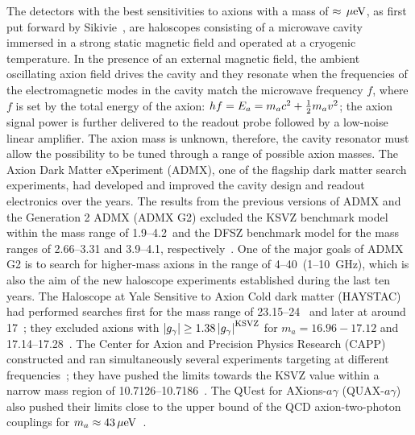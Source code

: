 The detectors with the best sensitivities to axions with a mass of 
$\approx \,\mu\text{e\hspace{-.08em}V}$, as first put forward by 
Sikivie~\cite{SikivieI,SikivieII},  
are haloscopes consisting of a microwave cavity immersed in a strong static 
magnetic field and operated at a cryogenic temperature. 
In the presence of an external magnetic field, the ambient oscillating axion 
field drives the cavity and they resonate when the frequencies of the 
electromagnetic 
modes in the cavity match the microwave frequency $f$, where $f$ is set by 
the total energy of the axion: $hf=E_a=m_a c^2 + \frac{1}{2}m_a v^2$; the 
axion signal power is further delivered %
to the readout probe followed by a low-noise linear amplifier. 
The axion mass is unknown, therefore, 
the cavity resonator must allow the possibility to be tuned through a range
of possible axion masses. The Axion Dark Matter eXperiment (ADMX), 
one of the flagship dark matter search experiments, had developed and 
improved the cavity design and readout electronics over the years. 
The results from the previous 
versions of ADMX and the Generation 2 ADMX (ADMX G2) excluded the KSVZ 
benchmark model within the mass range of %
1.9--4.2\muevcc\ and the DFSZ benchmark model for the mass ranges 
of 2.66--3.31 and 3.9--4.1\muevcc, 
respectively~\cite{ADMXI,ADMXII,ADMXIII,ADMXIV,ADMXV,ADMXVI,ADMXVII}. 
One of the major goals of ADMX G2 is to search for higher-mass axions in the 
range of 4--40\muevcc\ (1--10~GHz), which is also the aim of  
the new haloscope experiments established during the last ten years.  
The Haloscope at Yale Sensitive to Axion Cold dark matter 
(HAYSTAC) had performed searches first for the mass range of 
23.15--24\muevcc~\cite{HAYSTACIII,HAYSTACIV} and later at 
around 17\muevcc~\cite{HAYSTACI}; they excluded axions 
with $\left|g_{\gamma}\right|\geq 1.38 \left|g_{\gamma}\right|^\text{KSVZ}$ for $m_a=16.96-17.12$ and 
17.14--17.28\muevcc~\cite{HAYSTACI}. The Center 
for Axion and Precision Physics Research (CAPP) constructed 
and ran simultaneously several experiments targeting at 
different frequencies~\cite{CAPPII,CAPPIII,CAPPI}; 
they have pushed the limits towards the KSVZ value within a narrow mass 
region of 10.7126--10.7186\muevcc~\cite{CAPPI}.
The QUest for AXions-$a\gamma$ (QUAX-$a\gamma$) also pushed their limits 
close to the upper bound of the QCD axion-two-photon couplings for 
$m_a\approx43\,\mu\text{e\hspace{-.08em}V}$~\cite{QUAX}.   

